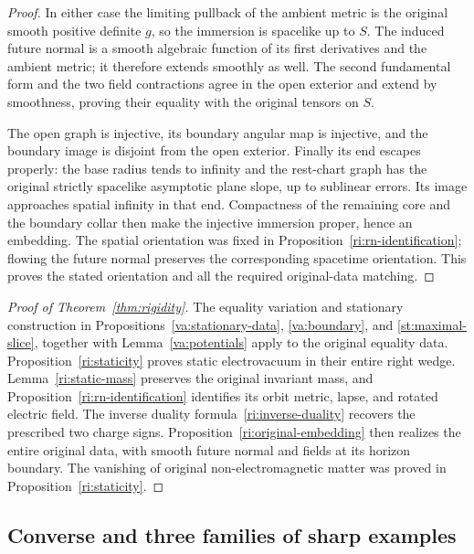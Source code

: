 \begin{proof}
In either case the limiting pullback of the ambient metric is
the original smooth positive definite $g$, so the immersion is
spacelike up to $S$.  The induced future normal is a smooth
algebraic function of its first derivatives and the ambient
metric; it therefore extends smoothly as well.  The second
fundamental form and the two field contractions agree in the
open exterior and extend by smoothness, proving their equality
with the original tensors on $S$.

The open graph is injective, its boundary angular map is
injective, and the boundary image is disjoint from the open
exterior.  Finally its end escapes properly: the base radius
tends to infinity and the rest-chart graph has the original
strictly spacelike asymptotic plane slope, up to sublinear
errors.  Its image approaches spatial infinity in that end.
Compactness of the remaining core and the boundary collar
then make the injective immersion proper, hence an embedding.
The spatial orientation was fixed in
Proposition~\ref{ri:rn-identification}; flowing the future
normal preserves the corresponding spacetime orientation.
This proves the stated orientation and all the required
original-data matching.
\end{proof}

\begin{proof}[Proof of Theorem~\ref{thm:rigidity}]
The equality variation and stationary construction in
Propositions~\ref{va:stationary-data}, \ref{va:boundary}, and
\ref{st:maximal-slice}, together with Lemma~\ref{va:potentials} apply to the
original equality data.  Proposition~\ref{ri:staticity} proves
static electrovacuum in their entire right wedge.
Lemma~\ref{ri:static-mass} preserves the original invariant mass,
and Proposition~\ref{ri:rn-identification} identifies its orbit
metric, lapse, and rotated electric field.  The inverse duality
formula~\eqref{ri:inverse-duality} recovers the prescribed two
charge signs.  Proposition~\ref{ri:original-embedding} then
realizes the entire original data, with smooth future normal
and fields at its horizon boundary.  The vanishing of original
non-electromagnetic matter was proved in
Proposition~\ref{ri:staticity}.
\end{proof}

\subsection{Converse and three families of sharp examples}
\label{ri:examples-subsection}

